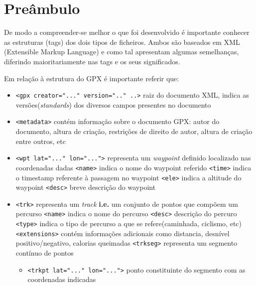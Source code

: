 \documentclass{llncs}
\begin{document}
\section{Preâmbulo}\label{pb}
De modo a compreender-se melhor o que foi desenvolvido é importante conhecer as estruturas (tags) dos dois tipos de ficheiros. Ambos são baseados em XML (Extensible Markup Language) e como tal apresentam algumas semelhanças, diferindo maioritariamente nas tags e os seus significados. 

Em relação à estrutura do GPX é importante referir que:
\begin{itemize}
    \item \verb|<gpx creator="..." version=".." ..>| raiz do documento XML, indica as versões(\textit{standards}) dos diversos campos presentes no documento
    \item \verb|<metadata>| contém informação sobre o documento GPX: autor do documento, altura de criação, restrições de direito de autor, altura de criação entre outros, etc
    \item \verb|<wpt lat="..." lon="...">| representa um \textit{waypoint} definido  localizado nas coordenadas dadas
        \subitem \verb|<name>| indica o nome do waypoint referido
        \subitem \verb|<time>| indica o timestamp referente à passagem no waypoint
        \subitem \verb|<ele>| indica a altitude do waypoint
        \subitem \verb|<desc>| breve descrição do waypoint
    \item \verb|<trk>| representa um \textit{track} \textbf{i.e.} um conjunto de pontos que compõem um percurso
        \subitem \verb|<name>| indica o nome do percurso
        \subitem \verb|<desc>| descrição do percuro
        \subitem \verb|<type>| indica o tipo de percurso a que se refere(caminhada, ciclismo, etc)
        \subitem \verb|<extensions>| contém informações adicionais como distancia, desnível positivo/negativo, calorias queimadas
        \subitem \verb|<trkseg>| representa um segmento contínuo de pontos
            \begin{itemize}
                \item \verb|<trkpt lat="..." lon="...">| ponto constituinte do segmento com as coordenadas indicadas
            \end{itemize}
\end{itemize}
\end{document}
